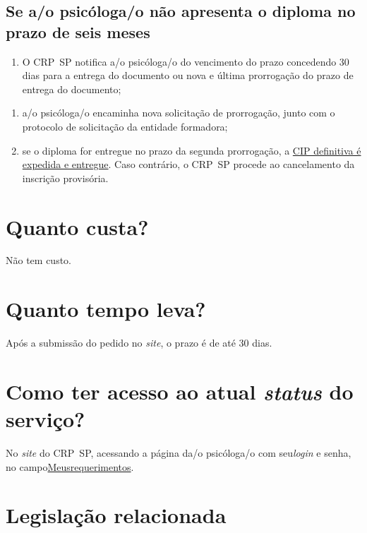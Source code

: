 \subsection{Se a/o psicóloga/o não apresenta o diploma no prazo de seis meses}

\begin{enumerate}
  \item  O CRP~SP notifica a/o psicóloga/o do vencimento do prazo concedendo 30  dias para a entrega do documento ou nova e última prorrogação do prazo  de entrega do documento;
\end{enumerate}

\begin{enumerate}
  \item  a/o psicóloga/o encaminha nova solicitação de prorrogação, junto com o  protocolo de solicitação da entidade formadora;
  \item  se o diploma for entregue no prazo da segunda prorrogação, a  \hyperref[]{CIP  definitiva é expedida e entregue}. Caso contrário, o CRP~SP procede ao  cancelamento da inscrição provisória.
\end{enumerate}

\section{Quanto custa?}

Não tem custo.

\section{Quanto tempo leva?}

Após a submissão do pedido no \emph{site}, o prazo é de até 30 dias.

\section{Como ter acesso ao atual \emph{status} do serviço?}

No \emph{site} do CRP~SP, acessando a página da/o psicóloga/o com seu\emph{login} e senha, no campo\href{https://cfpsp.brctotal.com/crp06_servicosonline/pgsRequerimento/MeusRequerimentos.aspx}{Meusrequerimentos}.

\section{Legislação relacionada}

